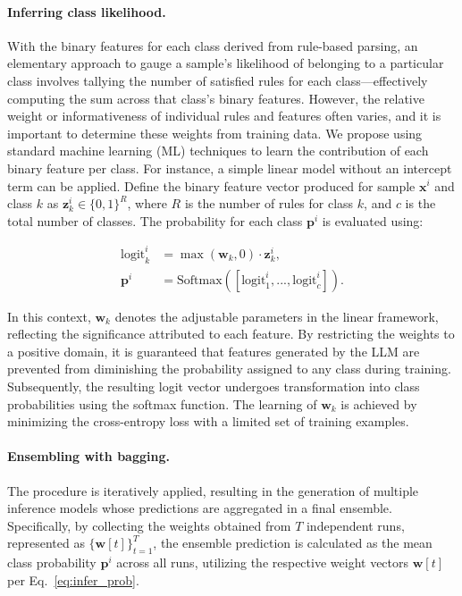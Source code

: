 \paragraph{Inferring class likelihood.} With the binary features for each class derived from rule-based parsing, an elementary approach to gauge a sample’s likelihood of belonging to a particular class involves tallying the number of satisfied rules for each class—effectively computing the sum across that class’s binary features. However, the relative weight or informativeness of individual rules and features often varies, and it is important to determine these weights from training data. We propose using standard machine learning (ML) techniques to learn the contribution of each binary feature per class. For instance, a simple linear model without an intercept term can be applied. Define the binary feature vector produced for sample $\mathbf{x}^i$ and class $k$ as $\mathbf{z}_k^i \in \{0, 1\}^R$, where $R$ is the number of rules for class $k$, and $c$ is the total number of classes. The probability for each class $\mathbf{p}^i$ is evaluated using:

\begin{align}
\text{logit}_k^i &= \max(\mathbf{w}_k, 0) \cdot \mathbf{z}_k^i, \nonumber \\
\mathbf{p}^i &= \text{Softmax}({[\text{logit}_{1}^i, ..., \text{logit}_{c}^i]}). \label{eq:infer_prob}
\end{align}

In this context, $\mathbf{w}_k$ denotes the adjustable parameters in the linear framework, reflecting the significance attributed to each feature. By restricting the weights to a positive domain, it is guaranteed that features generated by the LLM are prevented from diminishing the probability assigned to any class during training. Subsequently, the resulting logit vector undergoes transformation into class probabilities using the softmax function. The learning of $\mathbf{w}_k$ is achieved by minimizing the cross-entropy loss with a limited set of training examples.

\vspace*{-0.12in}
\paragraph{Ensembling with bagging.} The procedure is iteratively applied, resulting in the generation of multiple inference models whose predictions are aggregated in a final ensemble. Specifically, by collecting the weights obtained from $T$ independent runs, represented as $\{\mathbf{w}[t]\}_{t=1}^T$, the ensemble prediction is calculated as the mean class probability $\mathbf{p}^i$ across all runs, utilizing the respective weight vectors $\mathbf{w}[t]$ per Eq.~\ref{eq:infer_prob}.


